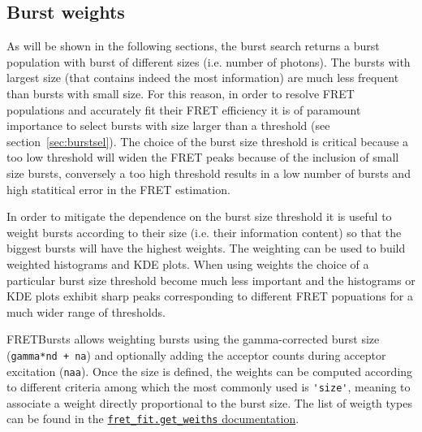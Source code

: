 \subsection{Burst weights}
As will be shown in the following sections, the burst search returns a 
burst population with burst of different sizes (i.e. number of photons). 
The bursts with largest size (that contains indeed the most information) 
are much less frequent than bursts with small size. For this reason, in order 
to resolve FRET populations and accurately fit their FRET efficiency it is of
paramount importance to select bursts with size larger than a threshold (see 
section~\ref{sec:burstsel}). The choice of the burst size threshold is 
critical because a too low threshold will widen the FRET peaks because of 
the inclusion of small size bursts, conversely a too high threshold results
in a low number of bursts and high statitical error in the FRET estimation.

In order to mitigate the dependence on the burst size threshold it is 
useful to weight bursts according to their size (i.e. their 
information content) so that the biggest bursts will have the highest weights. 
The weighting can be used to build weighted histograms and KDE plots.
When using weights the choice of a particular burst size threshold become 
much less important and the histograms or KDE plots exhibit sharp
peaks corresponding to different FRET popuations for a much wider range
of thresholds. 

FRETBursts allows weighting bursts using the gamma-corrected burst size
(\verb|gamma*nd + na|) and optionally adding the acceptor counts during
acceptor excitation (\verb|naa|). Once the size is defined, the weights
can be computed according to different criteria among which the most
commonly used is \verb|'size'|, meaning to associate a weight 
directly proportional to the burst size. The list of weigth types
can be found in the 
\href{http://fretbursts.readthedocs.org/en/latest/fret_fit.html#fretbursts.fret_fit.get_weights}{\texttt{fret\_fit.get\_weiths} documentation}.


